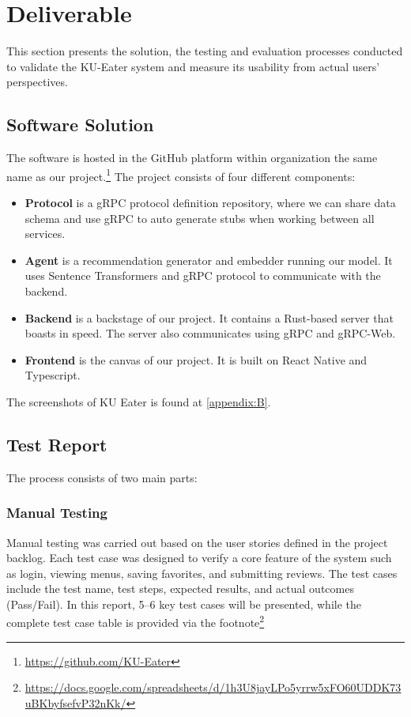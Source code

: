 \chapter{Deliverable}
\label{chap:deliverable}
This section presents the solution, the testing and evaluation processes conducted to validate the KU-Eater system and measure its usability from actual users' perspectives.

\section{Software Solution}
\label{section:software-solution}
The software is hosted in the GitHub platform within organization the same name as our project.\footnote{\url{https://github.com/KU-Eater}}
The project consists of four different components:
\begin{itemize}[leftmargin=40pt]
    \item \textbf{Protocol} is a gRPC protocol definition repository, where we can share data schema and use gRPC to auto generate stubs when working between all services.
    \item \textbf{Agent} is a recommendation generator and embedder running our model. It uses Sentence Transformers and gRPC protocol to communicate with the backend.
    \item \textbf{Backend} is a backstage of our project. It contains a Rust-based server that boasts in speed. The server also communicates using gRPC and gRPC-Web.
    \item \textbf{Frontend} is the canvas of our project. It is built on React Native and Typescript.
\end{itemize}

The screenshots of KU Eater is found at \ref{appendix:B}.

\section{Test Report}
\label{section:test-report}
The process consists of two main parts:

\subsection{Manual Testing}
\label{subsection:manual-test}
Manual testing was carried out based on the user stories defined in the project backlog. Each test case was designed to verify a core feature of the system such as login, viewing menus, saving favorites, and submitting reviews. The test cases include the test name, test steps, expected results, and actual outcomes (Pass/Fail). In this report, 5–6 key test cases will be presented, while the complete test case table is provided via the footnote\footnote{\url{https://docs.google.com/spreadsheets/d/1h3U8jayLPo5yrrw5xFO60UDDK73uBKbyfsefvP32nKk/}}

